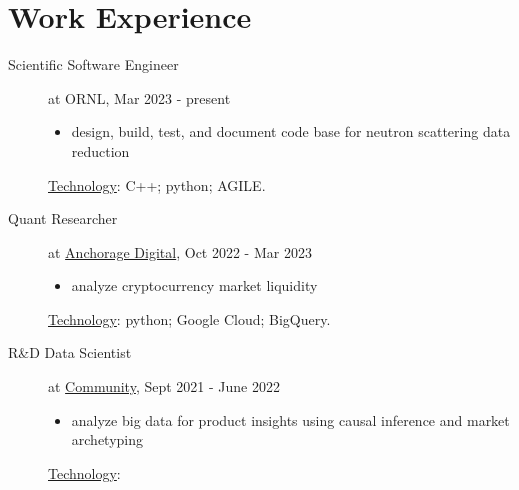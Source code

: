 \documentclass[11pt, letter]{article}
\begin{document}
\section*{Work Experience}
\begin{minipage}{\textwidth}
	\begin{description}
	\item[Scientific Software Engineer] at ORNL, Mar 2023 - present
		\vspace{-0.5\baselineskip}
		\begin{itemize}
			\item design, build, test, and document code base for neutron scattering data reduction
		\end{itemize}
		\vspace{-0.5\baselineskip}
		\underline{Technology}: 
		C++; python; AGILE.
	\item[Quant Researcher] at \href{https://www.anchorage.com}{Anchorage Digital}, Oct 2022 - Mar 2023
		\vspace{-0.5\baselineskip}
		\begin{itemize}
			\item analyze cryptocurrency market liquidity
		\end{itemize}
		\vspace{-0.5\baselineskip}
		\underline{Technology}: 
		python; Google Cloud; BigQuery.
	\item[R\&D Data Scientist] at \href{https://www.community.com/about-us}{Community}, Sept 2021 - June 2022
		\vspace{-0.5\baselineskip}
		\begin{itemize}
			\item analyze big data for product insights using causal inference and market archetyping%
		\end{itemize}
		\vspace{-0.5\baselineskip}
		\underline{Technology}: 

\end{description}
\end{minipage}
\end{document}
